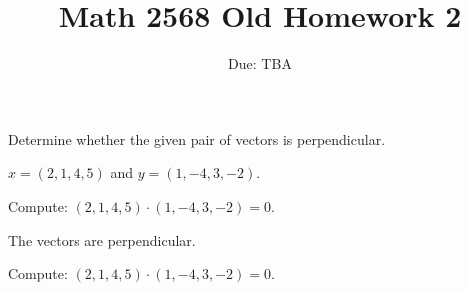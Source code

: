 \documentclass{ximera}
\title{Math 2568 Old Homework 2}
\author{\phantom{Dr. Golubitsky}}
\date{Due: TBA}
\begin{document}


\problemlabel

\noindent Determine whether the given pair of vectors is perpendicular.

\begin{exercise} \label{c1.4.1c}
  $x=(2,1,4,5)$ and $y=(1,-4,3,-2)$.
    \begin{multipleChoice}
  \end{multipleChoice}
  \begin{hint}
    Compute: $(2,1,4,5) \cdot (1,-4,3,-2) = 0$.
  \end{hint}

\begin{solution}
\ans The vectors are perpendicular.

\soln Compute: $(2,1,4,5) \cdot (1,-4,3,-2) = 0$.

\end{solution}
\end{exercise}

\problemlabel
\end{document}
